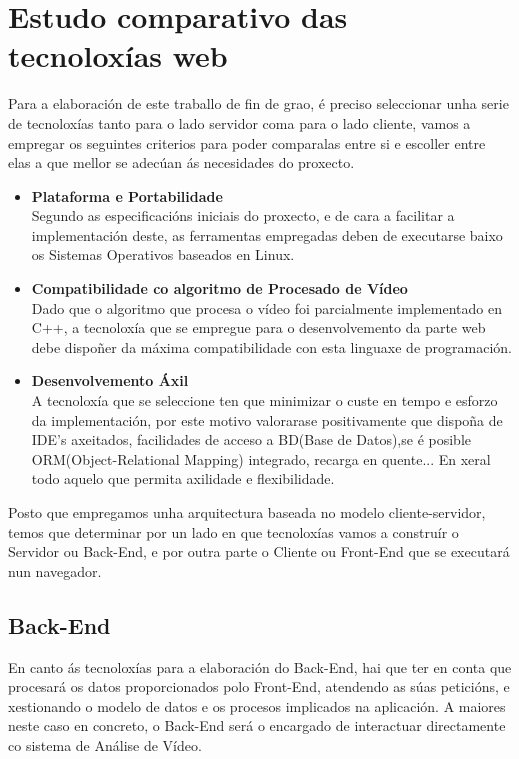 \chapter{Estudo comparativo das tecnoloxías web}

Para a elaboración de este traballo de fin de grao, é preciso seleccionar unha serie de
tecnoloxías tanto para o lado servidor coma para o lado cliente, vamos a empregar os seguintes
criterios para poder comparalas entre si e escoller entre elas a que mellor se adecúan ás 
necesidades do proxecto.

\begin{itemize}

	\item {\textbf{Plataforma e Portabilidade\\}}
		Segundo as especificacións iniciais do proxecto, e de cara a facilitar a 
		implementación deste, as ferramentas empregadas deben de executarse baixo os
		Sistemas Operativos baseados en Linux.

	\item {\textbf{Compatibilidade co algoritmo de Procesado de Vídeo\\}}
		Dado que o algoritmo que procesa o vídeo foi parcialmente implementado en C++,
		a tecnoloxía que se empregue para o desenvolvemento da parte web debe dispoñer da
		máxima compatibilidade con esta linguaxe de programación.

	\item {\textbf{Desenvolvemento Áxil\\}}
		A tecnoloxía que se seleccione ten que minimizar o custe en tempo e esforzo da 
		implementación, por este motivo valorarase positivamente que dispoña de IDE's axeitados,
		facilidades de acceso a BD(Base de Datos),se é posible ORM(Object-Relational Mapping) 
		integrado, recarga en quente... En xeral todo aquelo que permita axilidade e flexibilidade.

\end{itemize}

Posto que empregamos unha arquitectura baseada no modelo cliente-servidor, temos que determinar 
por un lado en que tecnoloxías vamos a construír o Servidor ou Back-End, e por outra parte o 
Cliente ou Front-End que se executará nun navegador.  

\section{Back-End}
	En canto ás tecnoloxías para a elaboración do Back-End, hai que ter en conta que procesará
	os datos proporcionados polo Front-End, atendendo as súas peticións, e xestionando o modelo de 
	datos e os procesos implicados na aplicación. A maiores neste caso en concreto, o Back-End será
	o encargado de interactuar directamente co sistema de Análise de Vídeo.\\
	
